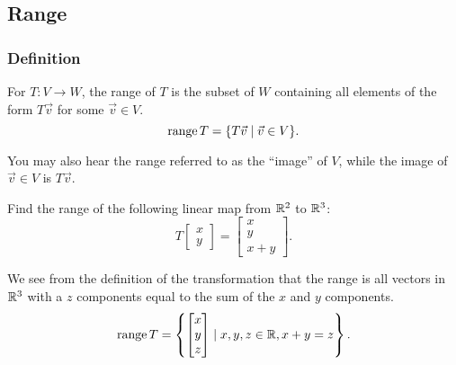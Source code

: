 \subsection{Range}

\subsubsection{Definition}
\begin{definition}
	For $T: V \to W$, the range of $T$ is the subset of $W$ containing all elements of the form $T\vec{v}$ for some $\vec{v} \in V$.
	\begin{equation*}
		\operatorname{range}{T} = \{T\vec{v} \mid \vec{v} \in V\}.
	\end{equation*}
\end{definition}
You may also hear the range referred to as the ``image'' of $V$, while the image of $\vec{v} \in V$ is $T\vec{v}$.

\begin{example}
	Find the range of the following linear map from $\mathbb{R}^2$ to $\mathbb{R}^3$:
	\begin{equation*}
		T\begin{bmatrix}
			x \\ y
		\end{bmatrix} = \begin{bmatrix}
			x \\ y \\ x+y
		\end{bmatrix}.
	\end{equation*}
\end{example}
\begin{answer}
	We see from the definition of the transformation that the range is all vectors in $\mathbb{R}^3$ with a $z$ components equal to the sum of the $x$ and $y$ components.
	\begin{equation*}
		\operatorname{range}{T} = \left\{\begin{bmatrix}
			x \\ y \\ z
		\end{bmatrix} \mid x,y,z \in \mathbb{R}, x+y=z \right\}.
	\end{equation*}
\end{answer}

